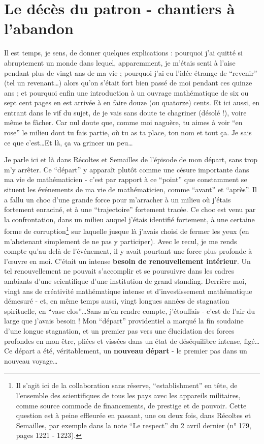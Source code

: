 \section{Le décès du patron - chantiers à l'abandon}

Il est temps, je sens, de donner quelques explications : pourquoi j'ai quitté si abruptement un monde dans lequel, apparemment, je m'étais senti à l'aise pendant plus de vingt ans de ma vie ; pourquoi j'ai eu l'idée étrange de ``revenir'' (tel un revenant\ldots) alors qu'on s'était fort bien passé de moi pendant ces quinze ans ; et pourquoi enfin une introduction à un ouvrage mathématique de six ou sept cent pages en est arrivée à en faire douze (ou quatorze) cents. Et ici aussi, en entrant dans le vif du sujet, de je vais sans doute te chagriner (désolé !), voire même te fâcher. Car nul doute que, comme moi naguère, tu aimes à voir ``en rose'' le milieu dont tu fais partie, où tu as ta place, ton nom et tout ça. Je sais ce que c'est\ldots Et là, ça va grincer un peu\ldots

Je parle ici et là dans Récoltes et Semailles de l'épisode de mon départ, sans trop m'y arrêter. Ce ``départ'' y apparaît plutôt comme une césure importante dans ma vie de mathématicien - c'est par rapport à ce ``point'' que constamment se situent les événements de ma vie de mathématicien, comme ``avant'' et ``après''. Il a fallu un choc d'une grande force pour m'arracher à un milieu où j'étais fortement enraciné, et à une ``trajectoire'' fortement tracée. Ce choc est venu par la confrontation, dans un milieu auquel j'étais identifié fortement, à une certaine forme de corruption\footnote{Il s'agit ici de la collaboration sans réserve, ``establishment'' en tête, de l'ensemble des scientifiques de tous les pays avec les appareils militaires, comme source commode de financements, de prestige et de pouvoir. Cette question est à peine effleurée en passant, une ou deux fois, dans Récoltes et Semailles, par exemple dans la note ``Le respect'' du 2 avril dernier (n° 179, pages 1221 - 1223).} sur laquelle jusque là j'avais choisi de fermer les yeux (en m'abstenant simplement de ne pas y participer). Avec le recul, je me rends compte qu'au delà de l'événement, il y avait pourtant une force plus profonde à l'œuvre en moi. C'était un intense \textbf{besoin de renouvellement intérieur}. Un tel renouvellement ne pouvait s'accomplir et se poursuivre dans les cadres ambiants d'une scientifique d'une institution de grand standing. Derrière moi, vingt ans de créativité mathématique intense et d'investissement mathématique démesuré - et, en même temps aussi, vingt longues années de stagnation spirituelle, en ``vase clos''\ldots Sans m'en rendre compte, j'étouffais - c'est de l'air du large que j'avais besoin ! Mon ``départ'' providentiel a marqué la fin soudaine d'une longue stagnation, et un premier pas vers une élucidation des forces profondes en mon être, pliées et vissées dans un état de déséquilibre intense, figé\ldots Ce départ a été, véritablement, un \textbf{nouveau départ} - le premier pas dans un nouveau voyage\ldots

